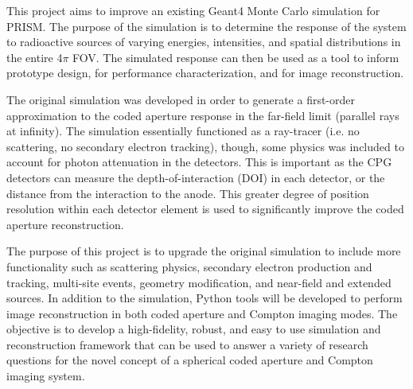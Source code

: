 \documentclass[10pt]{article}
\begin{document}


This project aims to improve an existing Geant4 \cite{Agostinelli2003} Monte Carlo simulation for PRISM. The purpose of the simulation is to determine the response of the system to radioactive sources of varying energies, intensities, and spatial distributions in the entire 4$\pi$ FOV. The simulated response can then be used as a tool to inform prototype design, for performance characterization, and for image reconstruction.

The original simulation was developed in order to generate a first-order approximation to the coded aperture response in the far-field limit (parallel rays at infinity). The simulation essentially functioned as a ray-tracer (i.e. no scattering, no secondary electron tracking), though, some physics was included to account for photon attenuation in the detectors. This is important as the CPG detectors can measure the depth-of-interaction (DOI) in each detector, or the distance from the interaction to the anode. This greater degree of position resolution within each detector element is used to significantly improve the coded aperture reconstruction. 

The purpose of this project is to upgrade the original simulation to include more functionality such as scattering physics, secondary electron production and tracking, multi-site events, geometry modification, and near-field and extended sources. In addition to the simulation, Python tools will be developed to perform image reconstruction in both coded aperture and Compton imaging modes. The objective is to develop a high-fidelity, robust, and easy to use simulation and reconstruction framework that can be used to answer a variety of research questions for the novel concept of a spherical coded aperture and Compton imaging system. 
\end{document}
